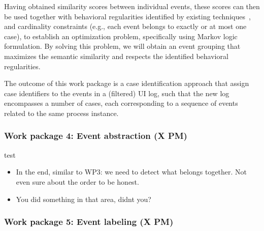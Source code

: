  Having obtained similarity scores between individual events, these scores can then be used together with behavioral regularities identified by existing techniques~\cite{ref}, and cardinality constraints (e.g., each event belongs to exactly or at most one case), to establish an optimization problem, specifically using Markov logic formulation. By solving this problem, we will obtain an event grouping that maximizes the semantic similarity and respects the identified behavioral regularities.

The outcome of this work package is a case identification approach that assign case identifiers to the events in a (filtered) UI log, such that the new log encompasses a number of cases, each corresponding to a sequence of events related to the same process instance.





\subsubsection{Work package 4: Event abstraction (X PM)}
\label{sec:wp4}
test
\begin{itemize}
\item In the end, similar to WP3: we need to detect what belongs together. Not even sure about the order to be honest. 
\item You did something in that area, didnt you?
\end{itemize}

\subsubsection{Work package 5: Event labeling (X PM)}
\label{sec:wp5}

